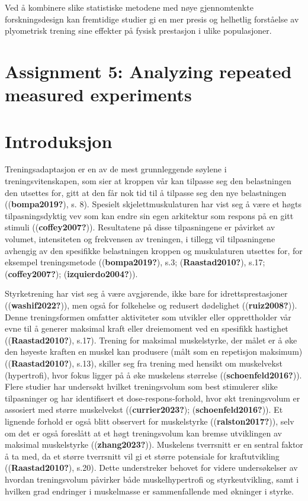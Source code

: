 \documentclass[
  letterpaper,
  DIV=11,
  numbers=noendperiod]{scrreprt}
\begin{document}
Ved å kombinere slike statistiske metodene med nøye gjennomtenkte
forskningsdesign kan fremtidige studier gi en mer presis og helhetlig
forståelse av plyometrisk trening sine effekter på fysisk prestasjon i
ulike populasjoner.


\chapter{Assignment 5: Analyzing repeated measured
experiments}\label{assignment-5-analyzing-repeated-measured-experiments}


\chapter{Introduksjon}\label{introduksjon-5}

Treningsadaptasjon er en av de mest grunnleggende søylene i
treningsvitenskapen, som sier at kroppen vår kan tilpasse seg den
belastningen den utsettes for, gitt at den får nok tid til å tilpasse
seg den nye belastningen ((\textbf{bompa2019?}), s. 8). Spesielt
skjelettmuskulaturen har vist seg å være et høgts tilpasningsdyktig vev
som kan endre sin egen arkitektur som respons på en gitt stimuli
((\textbf{coffey2007?})). Resultatene på disse tilpasningene er påvirket
av volumet, intensiteten og frekvensen av treningen, i tillegg vil
tilpasningene avhengig av den spesifikke belastningen kroppen og
muskulaturen utsettes for, for eksempel treningsmetode
((\textbf{bompa2019?}), s.3; (\textbf{Raastad2010?}), s.17;
(\textbf{coffey2007?}); (\textbf{izquierdo2004?})).

Styrketrening har vist seg å være avgjørende, ikke bare for
idrettsprestasjoner ((\textbf{washif2022?})), men også for folkehelse og
redusert dødelighet ((\textbf{ruiz2008?})). Denne treningsformen
omfatter aktiviteter som utvikler eller opprettholder vår evne til å
generer maksimal kraft eller dreiemoment ved en spesifikk hastighet
((\textbf{Raastad2010?}), s.17). Trening for maksimal muskelstyrke, der
målet er å øke den høyeste kraften en muskel kan produsere (målt som en
repetisjon maksimum) ((\textbf{Raastad2010?}), s.13), skiller seg fra
trening med hensikt om muskelvekst (hypertrofi), hvor fokus ligger på å
øke muskelens størrelse ((\textbf{schoenfeld2016?})). Flere studier har
undersøkt hvilket treningsvolum som best stimulerer slike tilpasninger
og har identifisert et dose-respons-forhold, hvor økt treningsvolum er
assosiert med større muskelvekst ((\textbf{currier2023?});
(\textbf{schoenfeld2016?})). Et lignende forhold er også blitt observert
for muskelstyrke ((\textbf{ralston2017?})), selv om det er også
foreslått at et høgt treningsvolum kan bremse utviklingen av maksimal
muskelstyrke ((\textbf{zhang2023?})). Muskelens tverrsnitt er en sentral
faktor å ta med, da et større tverrsnitt vil gi et større potensiale for
kraftutvikling ((\textbf{Raastad2010?}), s.20). Dette understreker
behovet for videre undersøkelser av hvordan treningsvolum påvirker både
muskelhypertrofi og styrkeutvikling, samt i hvilken grad endringer i
muskelmasse er sammenfallende med økninger i styrke.
\end{document}
